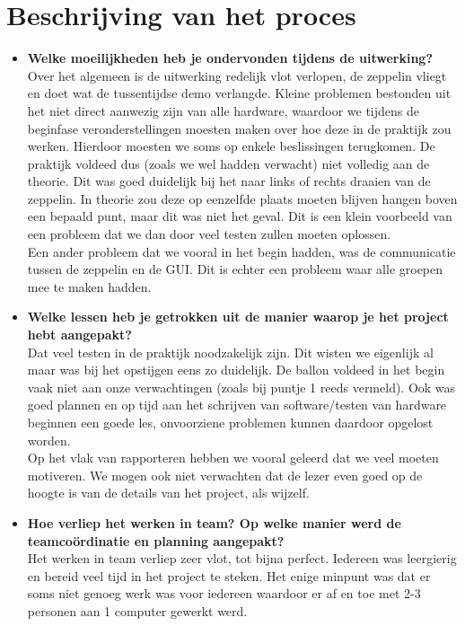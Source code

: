 \documentclass[tt]{penoverslag}
\begin{document}
\section{Beschrijving van het proces}
\begin{itemize}
\item \textbf{Welke moeilijkheden heb je ondervonden tijdens de uitwerking?} \\
Over het algemeen is de uitwerking redelijk vlot verlopen, de zeppelin vliegt en doet wat de tussentijdse demo verlangde.  Kleine problemen bestonden uit het niet direct aanwezig zijn van alle hardware, waardoor we tijdens de beginfase veronderstellingen moesten maken over hoe deze in de praktijk zou werken. Hierdoor moesten we soms op enkele beslissingen terugkomen. De praktijk voldeed dus (zoals we wel hadden verwacht) niet volledig aan de theorie. Dit was goed duidelijk bij het naar links of rechts draaien van de zeppelin. In theorie zou deze op eenzelfde plaats moeten blijven hangen boven een bepaald punt, maar dit was niet het geval. Dit is een klein voorbeeld van een probleem dat we dan door veel testen zullen moeten oplossen. \\
Een ander probleem dat we vooral in het begin hadden, was de communicatie tussen de zeppelin en de GUI. Dit is echter een probleem waar alle groepen mee te maken hadden.
\item \textbf{Welke lessen heb je getrokken uit de manier waarop je het project hebt aangepakt?} \\
Dat veel testen in de praktijk noodzakelijk zijn. Dit wisten we eigenlijk al maar was bij het opstijgen eens zo duidelijk. De ballon voldeed in het begin vaak niet aan onze verwachtingen (zoals bij puntje 1 reeds vermeld). Ook was goed plannen en op tijd aan het schrijven van software/testen van hardware beginnen een goede les, onvoorziene problemen kunnen daardoor opgelost worden. \\
Op het vlak van rapporteren hebben we vooral geleerd dat we veel moeten motiveren. We mogen ook niet verwachten dat de lezer even goed op de hoogte is van de details van het project, als wijzelf.
\item \textbf{Hoe verliep het werken in team? Op welke manier werd de teamco\"ordinatie en planning aangepakt?} \\
Het werken in team verliep zeer vlot, tot bijna perfect. Iedereen was leergierig en bereid veel tijd in het project te steken. Het enige minpunt was dat er soms niet genoeg werk was voor iedereen waardoor er af en toe met 2-3 personen aan 1 computer gewerkt werd. \\

\end{itemize}
\end{document}
